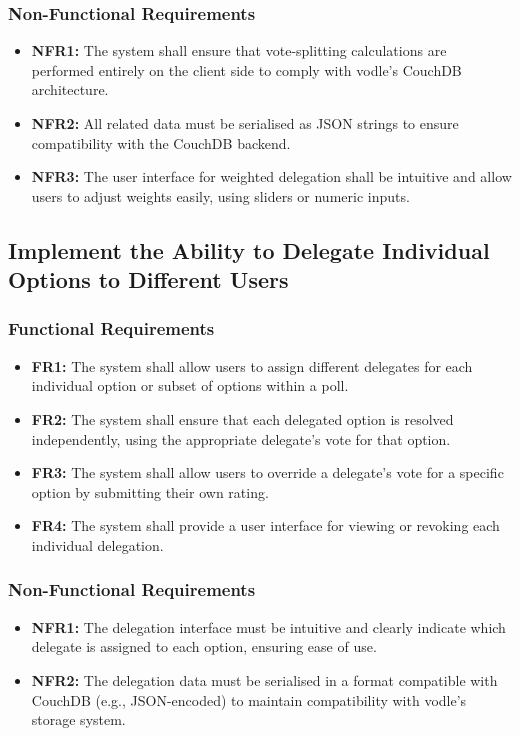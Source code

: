 \subsubsection{Non-Functional Requirements}
\begin{itemize}
    \item \textbf{NFR1:} The system shall ensure that vote-splitting calculations are performed entirely on the client side to comply with vodle's CouchDB architecture.

    \item \textbf{NFR2:} All related data must be serialised as JSON strings to ensure compatibility with the CouchDB backend.

    \item \textbf{NFR3:} The user interface for weighted delegation shall be intuitive and allow users to adjust weights easily, using sliders or numeric inputs.
\end{itemize}
\subsection{Implement the Ability to Delegate Individual Options to Different Users}
\subsubsection{Functional Requirements}
\begin{itemize}
    \item \textbf{FR1:} The system shall allow users to assign different delegates for each individual option or subset of options within a poll.

    \item \textbf{FR2:} The system shall ensure that each delegated option is resolved independently, using the appropriate delegate's vote for that option.

    \item \textbf{FR3:} The system shall allow users to override a delegate's vote for a specific option by submitting their own rating.

    \item \textbf{FR4:} The system shall provide a user interface for viewing or revoking each individual delegation.
\end{itemize}

\subsubsection{Non-Functional Requirements}
\begin{itemize}
    \item \textbf{NFR1:} The delegation interface must be intuitive and clearly indicate which delegate is assigned to each option, ensuring ease of use.

    \item \textbf{NFR2:} The delegation data must be serialised in a format compatible with CouchDB (e.g., JSON-encoded) to maintain compatibility with vodle's storage system.
\end{itemize}
